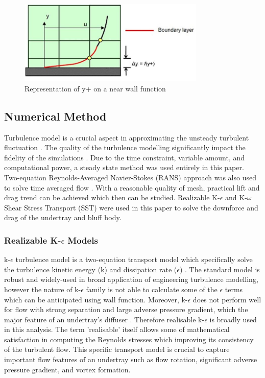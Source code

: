 \begin{figure}[!ht]
    \centering
    \includegraphics[height=4cm]{Figures/inflation_layer.jpg}
    \caption{Representation of y+ on a near wall function \cite{Anonymous2013Inflate4Blog}}
    \label{fig:inflation layer}
\end{figure}


\subsection{Numerical Method}
Turbulence model is a crucial aspect in approximating the unsteady turbulent fluctuation \cite{Cummings2015AppliedAerodynamics}. The quality of the turbulence modelling significantly impact the fidelity of the simulations \cite{Lanfrit2005BestFLUENT}. Due to the time constraint, variable amount, and computational power, a steady state method was used entirely in this paper. Two-equation Reynolds-Averaged Navier-Stokes (RANS) approach was also used to solve time averaged flow \cite{Cummings2015AppliedAerodynamics}. With a reasonable quality of mesh, practical lift and drag trend can be achieved which then can be studied. Realizable K-$\epsilon$ and K-$\omega$ Shear Stress Transport (SST) were used in this paper to solve the downforce and drag of the undertray and bluff body.  

\subsubsection{Realizable K-$\epsilon$ Models}
k-$\epsilon$  turbulence model is a  two-equation transport model which specifically solve the turbulence kinetic energy (k) and dissipation rate ($\epsilon$) \cite{Andersson2011Turbulent-flowModelling}\cite{Mansour1989Near-wallModeling}\cite{Ansys2006ModelingFlows}. The standard model is robust and widely-used in broad application of engineering turbulence modelling, however the nature of  k-$\epsilon$ family is not able to calculate some of the $\epsilon$ terms which can be anticipated using wall function. Moreover, k-$\epsilon$ does not perform well for flow with strong separation and large adverse pressure gradient, which the major feature of an undertray's diffuser \cite{Ansys2006ModelingFlows}.  Therefore realisable k-$\epsilon$ is broadly used in this analysis. The term 'realisable' itself allows some of mathematical satisfaction in computing the Reynolds stresses which improving its consistency of the turbulent flow. This specific transport model is crucial to capture important flow features of an undertray such as flow rotation, significant adverse pressure gradient, and vortex formation.

